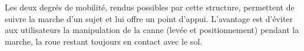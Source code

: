 \begin{multicols}{2}
Les deux degrés de mobilité, rendus possibles par cette structure, permettent de suivre la marche d'un sujet et lui offre un point d'appui. L'avantage est d'éviter aux utilisateurs la manipulation de la canne (levée et positionnement) pendant la marche, la roue restant toujours en contact avec le sol.
%
%
%
%  
%  
%  
%  
%  
%  
%  

\end{multicols}

